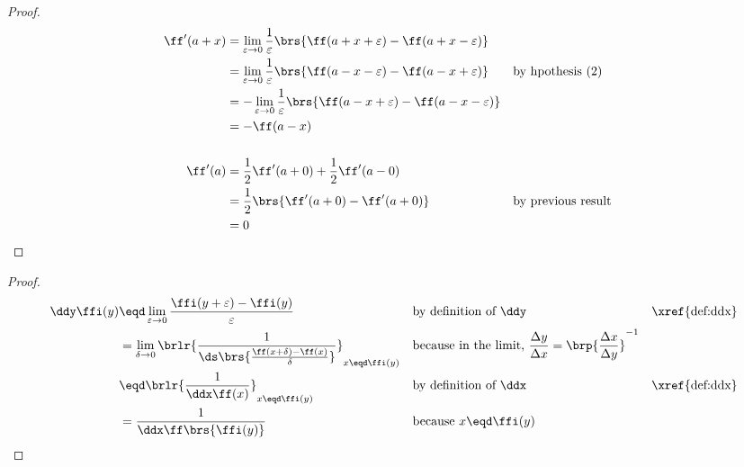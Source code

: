 \begin{proposition}
\label{prop:ddx_symmetry}
\end{proposition}
\begin{proof}
\begin{align*}
  \ff'(a+x)
    &= \lim_{\varepsilon\to0}\frac{1}{\varepsilon}\brs{\ff(a+x+\varepsilon)-\ff(a+x-\varepsilon)}
  \\&= \lim_{\varepsilon\to0}\frac{1}{\varepsilon}\brs{\ff(a-x-\varepsilon)-\ff(a-x+\varepsilon)}
    && \text{by hpothesis (2)}
  \\&= -\lim_{\varepsilon\to0}\frac{1}{\varepsilon}\brs{\ff(a-x+\varepsilon)-\ff(a-x-\varepsilon)}
  \\&= -\ff(a-x)
  \\
  \\
  \ff'(a)
    &= \frac{1}{2}\ff'(a+0) + \frac{1}{2}\ff'(a-0)
  \\&= \frac{1}{2}\brs{\ff'(a+0) - \ff'(a+0)}
    && \text{by previous result}
  \\&= 0
\end{align*}
\end{proof}

\begin{lemma}
\label{lem:ddyffi}
\end{lemma}
\begin{proof}
\begin{align*}
  \ddy\ffi(y)
    &\eqd \lim_{\varepsilon\to0}\frac{\ffi(y+\varepsilon)-\ffi(y)}{\varepsilon}
    &&    \text{by definition of $\ddy$} && \text{\xref{def:ddx}}
  \\&=    \lim_{\delta\to0}\brlr{\frac{1}{\ds\brs{\frac{\ff(x+\delta)-\ff(x)}{\delta}}}}_{x\eqd\ffi(y)}
    &&    \text{because in the limit, $\frac{\Delta y}{\Delta x}=\brp{\frac{\Delta x}{\Delta y}}^{-1}$}
  \\&\eqd \brlr{\frac{1}{\ddx\ff(x)}}_{x\eqd\ffi(y)}
    &&    \text{by definition of $\ddx$} && \text{\xref{def:ddx}}
  \\&=    \frac{1}{\ddx\ff\brs{\ffi(y)}}
    &&    \text{because $x\eqd\ffi(y)$}
\end{align*}
\end{proof}

